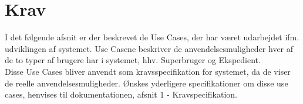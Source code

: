 \chapter{Krav}
I det følgende afsnit er der beskrevet de Use Cases, der har været udarbejdet ifm. udviklingen af systemet. Use Casene beskriver de anvendelsesmuligheder hver af de to typer af brugere har i systemet, hhv. Superbruger og Ekspedient.\\
Disse Use Cases bliver anvendt som kravsspecifikation for systemet, da de viser de reelle anvendelsesmuligheder. Ønskes yderligere specifikationer om disse use cases, henvises til dokumentationen, afsnit 1 - Kravspecifikation.



